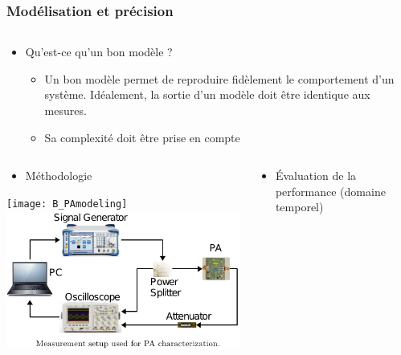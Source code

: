 \documentclass[aspectratio=169]{beamer}
\begin{document}
\begin{frame}
  \frametitle{Modélisation et précision}
  \vspace{-\baselineskip}
  \begin{columns}
    \begin{column}{1.2\textwidth}
      \footnotesize
      \begin{itemize}
        \item Qu'est-ce qu'un bon modèle ?
        \begin{itemize}
          \footnotesize
           \item Un bon modèle permet de reproduire fidèlement le comportement d'un système. 
           Idéalement, la sortie d'un modèle doit être identique aux mesures.
           \item Sa complexité doit être prise en compte
        \end{itemize}
     \end{itemize}
    \end{column}
  \end{columns}
  \begin{columns}[t]
    \begin{column}{0.4\textwidth}
      \footnotesize
     \begin{itemize}
       \item Méthodologie
     \end{itemize}
       \begin{center}
        \texttt{[image: B\_PAmodeling]}\\
        \includegraphics[width=0.8\columnwidth]{PAsetup}
       \end{center}
    \end{column}
    \begin{column}{0.6\textwidth}
      \footnotesize
     \begin{itemize}
       \item Évaluation de la performance (domaine temporel)

\end{itemize}
\end{column}
\end{columns}
\end{frame}
\end{document}
